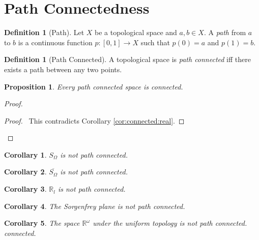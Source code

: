 \documentclass{report}
\newtheorem{prop}[lm]{Proposition}
\newtheorem{cor}{Corollary}[lm]
\theoremstyle{definition}
\newtheorem{df}[lm]{Definition}
\begin{document}
  \section{Path Connectedness}

  \begin{df}[Path]
    Let $X$ be a topological space and $a, b \in X$. A \emph{path} from $a$ to
    $b$ is a continuous function $p : [0, 1] \rightarrow X$ such that $p(0) =
    a$ and $p(1) = b$.
  \end{df}

  \begin{df}[Path Connected]
    A topological space is \emph{path connected} iff there exists a path
    between any two points.
  \end{df}

  \begin{prop}
    \label{prop:topology:path_connected:connected}
    Every path connected space is connected.
  \end{prop}

  \begin{proof}
    \pf
    \qedstep
    \begin{proof}
      \pf\ This contradicts Corollary \ref{cor:connected:real}.
    \end{proof}
  \end{proof}

  \begin{cor}
   $S_\Omega$ is not path connected.
  \end{cor}

  \begin{cor}
    $\overline{S_\Omega}$ is not path connected.
  \end{cor}

  \begin{cor}
    $\mathbb{R}_l$ is not path connected.
  \end{cor}

  \begin{cor}
   The Sorgenfrey plane is not path connected.
  \end{cor}

 \begin{cor}
   The space $\mathbb{R}^\omega$ under the uniform topology is not path connected.
connected.
 \end{cor}
\end{document}
